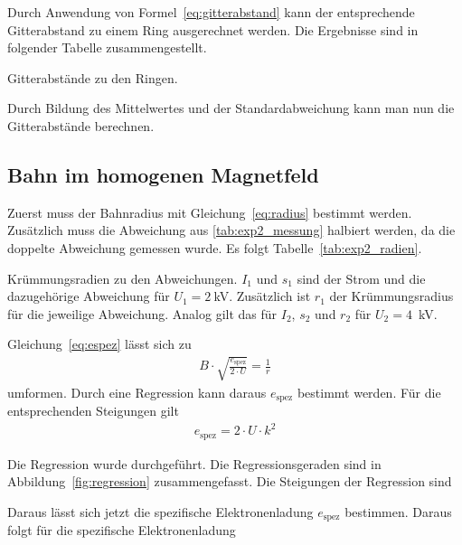 \documentclass{article}
\begin{document}
Durch Anwendung von Formel~\eqref{eq:gitterabstand} kann der entsprechende Gitterabstand zu einem Ring ausgerechnet werden. Die Ergebnisse sind in folgender Tabelle zusammengestellt.


\begin{table}[H]
\caption{Gitterabstände zu den Ringen.}
\label{tab:exp1_result}

\end{table}

Durch Bildung des Mittelwertes und der Standardabweichung kann man nun die Gitterabstände berechnen.



\subsection{Bahn im homogenen Magnetfeld}
Zuerst muss der Bahnradius mit Gleichung~\eqref{eq:radius} bestimmt werden. Zusätzlich muss die Abweichung aus \ref{tab:exp2_messung} halbiert werden, da die doppelte Abweichung gemessen wurde. Es folgt Tabelle~\ref{tab:exp2_radien}.

\begin{table}[H]
\caption{Krümmungsradien zu den Abweichungen. $I_1$ und $s_1$ sind der Strom und die dazugehörige Abweichung für $U_1=2~$kV. Zusätzlich ist $r_1$ der Krümmungsradius für die jeweilige Abweichung. Analog gilt das für $I_2$, $s_2$ und $r_2$ für $U_2=4$~kV.}
\label{tab:exp2_radien}

\end{table}

Gleichung~\eqref{eq:espez} lässt sich zu 
\begin{align*}
B \cdot \sqrt{\frac{e_\text{spez}}{2\cdot U}} = \frac{1}{r}
\end{align*}
umformen. Durch eine Regression kann daraus $e_\text{spez}$ bestimmt werden. Für die entsprechenden Steigungen gilt
\begin{align*}
e_\text{spez} = 2\cdot U \cdot k^2
\end{align*}

Die Regression wurde durchgeführt. Die Regressionsgeraden sind in Abbildung~\ref{fig:regression} zusammengefasst. Die Steigungen der Regression sind

Daraus lässt sich jetzt die spezifische Elektronenladung $e_\text{spez}$ bestimmen. Daraus folgt für die spezifische Elektronenladung

\end{document}
